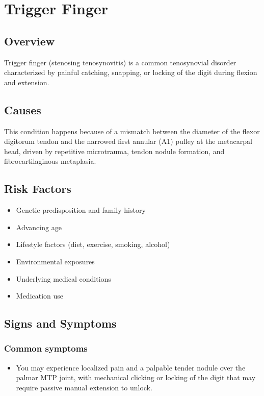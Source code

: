 \chapter{Trigger Finger}
\label{sec:Trigger Finger}

\section{Overview}
Trigger finger (stenosing tenosynovitis) is a common tenosynovial disorder characterized by painful catching, snapping, or locking of the digit during flexion and extension.
\section{Causes}
This condition happens because of a mismatch between the diameter of the flexor digitorum tendon and the narrowed first annular (A1) pulley at the metacarpal head, driven by repetitive microtrauma, tendon nodule formation, and fibrocartilaginous metaplasia.     
\section{Risk Factors}

\begin{itemize}[noitemsep]
  \item Genetic predisposition and family history
  \item Advancing age
  \item Lifestyle factors (diet, exercise, smoking, alcohol)
  \item Environmental exposures
  \item Underlying medical conditions
  \item Medication use
\end{itemize}
\section{Signs and Symptoms}

\subsection{Common symptoms}
\begin{itemize}[noitemsep]
  \item You may experience localized pain and a palpable tender nodule over the palmar MTP joint, with mechanical clicking or locking of the digit that may require passive manual extension to unlock. 
  \end{itemize}

